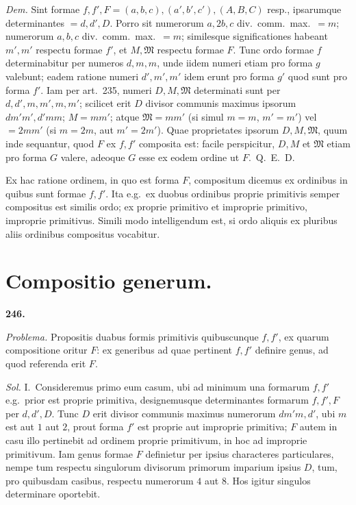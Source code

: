 \documentclass[12pt,a4paper]{article}
\theoremstyle{plain}
\theoremstyle{definition}
\theoremstyle{remark}
\begin{document}
\textit{Dem.} Sint formae $f, f', F = (a,b,c), (a',b',c'), (A,B,C)$ resp., ipsarumque determinantes $= d, d', D$. Porro sit numerorum $a, 2b, c$ div.\ comm.\ max.\ $= m$; numerorum $a, b, c$ div.\ comm.\ max.\ $= m$; similesque significationes habeant $m', m'$ respectu formae $f'$, et $M, \mathfrak{M}$ respectu formae $F$. Tunc ordo formae $f$ determinabitur per numeros $d, m, m$, unde iidem numeri etiam pro forma $g$ valebunt; eadem ratione numeri $d', m', m'$ idem erunt pro forma $g'$ quod sunt pro forma $f'$. Iam per art.\ 235, numeri $D, M, \mathfrak{M}$ determinati sunt per $d, d', m, m', m, m'$; scilicet erit $D$ divisor communis maximus ipsorum $dm'm', d'mm$; $M = mm'$; atque $\mathfrak{M} = mm'$ (si simul $m = m$, $m' = m'$) vel $= 2mm'$ (si $m = 2m$, aut $m' = 2m'$). Quae proprietates ipsorum $D, M, \mathfrak{M}$, quum inde sequantur, quod $F$ ex $f, f'$ composita est: facile perspicitur, $D, M$ et $\mathfrak{M}$ etiam pro forma $G$ valere, adeoque $G$ esse ex eodem ordine ut $F$.\ Q.\ E.\ D.

Ex hac ratione ordinem, in quo est forma $F$, compositum dicemus ex ordinibus in quibus sunt formae $f, f'$. Ita e.g.\ ex duobus ordinibus proprie primitivis semper compositus est similis ordo; ex proprie primitivo et improprie primitivo, improprie primitivus. Simili modo intelligendum est, si ordo aliquis ex pluribus aliis ordinibus compositus vocabitur.

\newpage
\section*{Compositio generum.}
\begin{center}\textbf{246.}\end{center}

\textit{Problema.} Propositis duabus formis primitivis quibuscunque $f, f'$, ex quarum compositione oritur $F$: ex generibus ad quae pertinent $f, f'$ definire genus, ad quod referenda erit $F$.

\textit{Sol.} I.\ Consideremus primo eum casum, ubi ad minimum una formarum $f, f'$ e.g.\ prior est proprie primitiva, designemusque determinantes formarum $f, f', F$ per $d, d', D$. Tunc $D$ erit divisor communis maximus numerorum $dm'm, d'$, ubi $m$ est aut $1$ aut $2$, prout forma $f'$ est proprie aut improprie primitiva; $F$ autem in casu illo pertinebit ad ordinem proprie primitivum, in hoc ad improprie primitivum. Iam genus formae $F$ definietur per ipsius characteres particulares, nempe tum respectu singulorum divisorum primorum imparium ipsius $D$, tum, pro quibusdam casibus, respectu numerorum $4$ aut $8$. Hos igitur singulos determinare oportebit.
\end{document}
